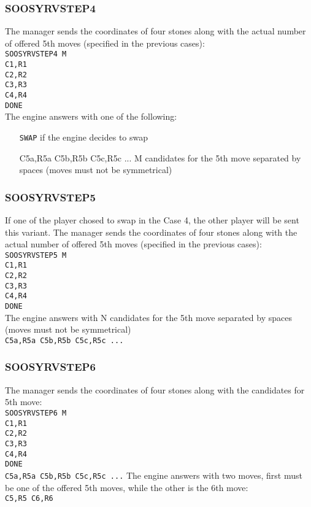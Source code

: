 \documentclass[12pt,a4paper]{article}
\begin{document}
\subsubsection{SOOSYRVSTEP4}
The manager sends the coordinates of four stones along with the actual number of offered 5th moves (specified in the previous cases):\\
\texttt{SOOSYRVSTEP4 M}\\
\texttt{C1,R1}\\
\texttt{C2,R2}\\
\texttt{C3,R3}\\
\texttt{C4,R4}\\
\texttt{DONE}\\
The engine answers with one of the following:
\begin{enumerate}[leftmargin=7.5em]
\item[\texttt{SWAP}]{if the engine decides to swap}
\item[C5a,R5a C5b,R5b C5c,R5c ...]{M candidates for the 5th move separated by spaces (moves must not be symmetrical)}
\end{enumerate}

\subsubsection{SOOSYRVSTEP5}
If one of the player chosed to swap in the Case 4, the other player will be sent this variant. The manager sends the coordinates of four stones along with the actual number of offered 5th moves (specified in the previous cases):\\
\texttt{SOOSYRVSTEP5 M}\\
\texttt{C1,R1}\\
\texttt{C2,R2}\\
\texttt{C3,R3}\\
\texttt{C4,R4}\\
\texttt{DONE}\\
The engine answers with N candidates for the 5th move separated by spaces (moves must not be symmetrical)\\
\texttt{C5a,R5a C5b,R5b C5c,R5c ...}

\subsubsection{SOOSYRVSTEP6}
The manager sends the coordinates of four stones along with the candidates for 5th move:\\
\texttt{SOOSYRVSTEP6 M}\\
\texttt{C1,R1}\\
\texttt{C2,R2}\\
\texttt{C3,R3}\\
\texttt{C4,R4}\\
\texttt{DONE}\\
\texttt{C5a,R5a C5b,R5b C5c,R5c ...}
The engine answers with two moves, first must be one of the offered 5th moves, while the other is the 6th move:\\
\texttt{C5,R5 C6,R6}
\end{document}

